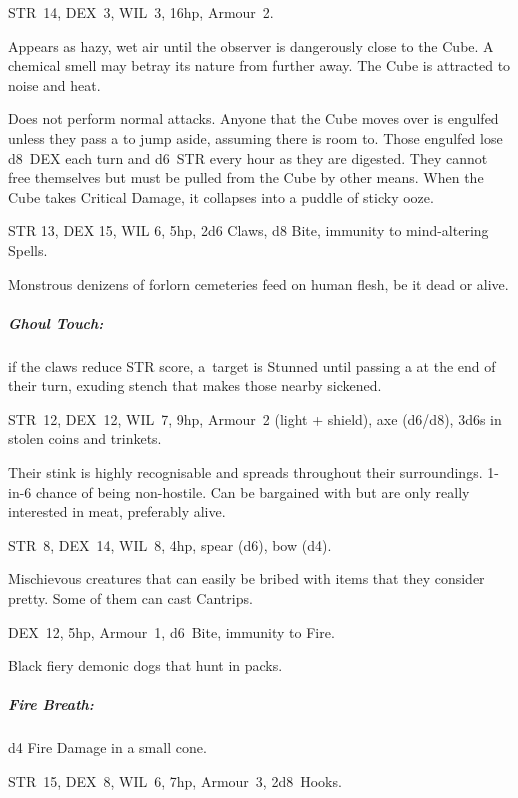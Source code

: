 \documentclass[itdr]{subfiles}
\begin{document}
\vfill

STR~14, DEX~3, WIL~3, 16hp, Armour~2.

Appears as hazy, wet air until the observer is dangerously close to the Cube. A chemical smell may betray its nature from further away. The Cube is
attracted to noise and heat.

Does not perform normal attacks. Anyone that the Cube moves over is engulfed unless they pass a  to jump aside, assuming there is room to. Those engulfed lose d8~DEX each turn and d6~STR every hour as they are digested. They cannot free themselves but must be pulled from the Cube by other means. When the Cube takes Critical Damage, it collapses into a puddle of sticky ooze.

\vfill

STR 13, DEX 15, WIL 6, 5hp, 2d6 Claws, d8 Bite, \mbox{immunity} to mind-altering Spells.

Monstrous denizens of forlorn cemeteries feed on human flesh, be it dead or alive.

\subparagraph{Ghoul Touch:} if the claws reduce STR score, \mbox{a target} is Stunned until passing a  at the end of their turn, exuding stench that makes those nearby sickened.

\vfill

STR~12, DEX~12, WIL~7, 9hp, Armour~2 (light + shield), axe (d6/d8), 3d6s in stolen coins and trinkets.

Their stink is highly recognisable and spreads throughout their surroundings.
1-in-6 chance of being non-hostile. Can be bargained with but are only really interested in meat, preferably alive.

\vfill
\break

STR~8, DEX~14, WIL~8, 4hp, spear (d6), bow (d4).

Mischievous creatures that can easily be bribed with items that they consider pretty. Some of them can cast Cantrips.

\vfill

DEX~12, 5hp, Armour~1, d6~Bite, immunity to Fire.

Black fiery demonic dogs that hunt in packs.

\subparagraph{Fire Breath:} d4 Fire Damage in a small cone.

\vfill

STR~15, DEX~8, WIL~6, 7hp, Armour~3, 2d8~Hooks.
\end{document}

